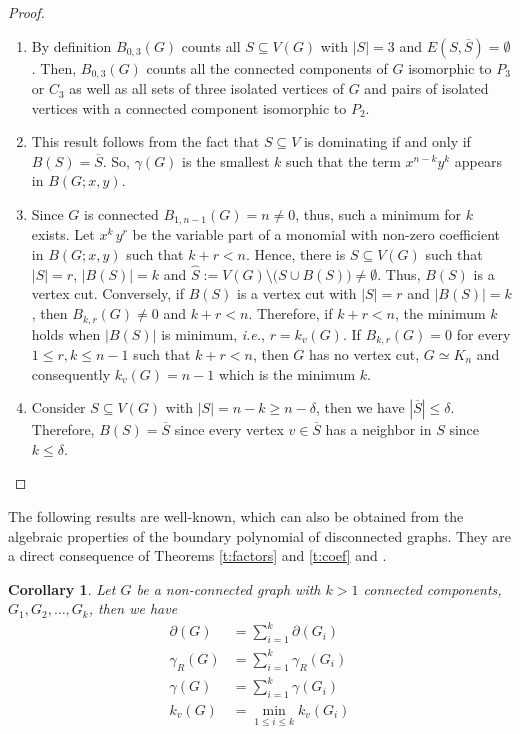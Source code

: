 \documentclass[review]{elsarticle}
\newtheorem{corollary}[theorem]{Corollary}
\renewcommand{\d}{\delta}
\newcommand{\g}{\gamma}
\newcommand{\p}{\partial}
\begin{document}
\begin{proof}
\begin{enumerate}[$i)$]
  \item {By definition $B_{0,3}(G)$ counts all $S\subseteq V(G)$ with $|S|=3$ and $E(S,\overline{S})=\emptyset$. Then, $B_{0,3}(G)$ counts all the connected components of $G$ isomorphic to $P_{3}$ or $C_{3}$ as well as all sets of three isolated vertices of $G$ and pairs of isolated vertices with a connected component isomorphic to $P_2$.}

  \item This result follows from the fact that $S\subseteq V$ is dominating if and only if $B(S)=\overline{S}$. So, $\g(G)$ is the smallest $k$ such that the term $x^{n-k}y^k$ appears in $B(G;x,y)$.

  \item {Since $G$ is connected $B_{1,n-1}(G)=n\neq0$, thus, such a minimum for $k$ exists. Let $x^k\,y^r$ be the variable part of a monomial with non-zero coefficient in $B(G;x,y)$ such that $k+r< n$. Hence, there is $S\subseteq V(G)$ such that $|S|=r$, $|B(S)|=k$ and $\hat{S}:=V(G)\setminus\big(S\cup B(S)\big)\neq\emptyset$. Thus, $B(S)$ is a vertex cut. Conversely, if $B(S)$ is a vertex cut with $|S|=r$ and $|B(S)|=k$, then $B_{k,r}(G)\neq0$ and $k+r<n$. Therefore, if $k+r<n$, the minimum $k$ holds when $|B(S)|$ is minimum, \emph{i.e.}, $r=k_v(G)$. If $B_{k,r}(G)=0$ for every $1\le r,k\le n-1$ such that $k+r<n$, then $G$ has no vertex cut, $G\simeq K_n$ and consequently $k_v(G)=n-1$ which is the minimum $k$.}

  \item {Consider $S\subseteq V(G)$ with $|S|=n-k\geq n-\d$, then we have $\left|\overline{S}\right|\leq\d$. Therefore, $B(S)=\overline{S}$ since every vertex $v\in\overline{S}$ has a neighbor in $S$ since $k\leq\d$.}
\end{enumerate}
\end{proof}

The following results are well-known, which can also be obtained from the algebraic properties of the boundary polynomial of disconnected graphs. They are a direct consequence of Theorems \ref{t:factors} and \ref{t:coef} and \cite[Theorem 1]{BFS}.

\begin{corollary}\label{c:factors}
   Let $G$ be a non-connected graph with $k>1$ connected components, ${G_1,G_2,\ldots,G_k}$, then we have
  \begin{equation}\label{eq:c_factors}
   \begin{aligned}
       \p(G)&=\displaystyle\sum_{i=1}^{k} \p(G_i) \\
       \g_R(G)&=\displaystyle\sum_{i=1}^{k} \g_R(G_i) \\
       \g(G)&=\displaystyle\sum_{i=1}^{k} \g(G_i) \\
       k_v(G)&=\displaystyle\min_{1\le i\le k} k_v(G_i)
   \end{aligned}
  \end{equation}
\end{corollary}
\end{document}
